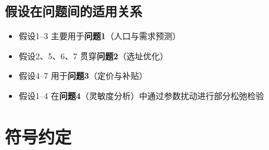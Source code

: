 \documentclass[UTF8]{ctexart}
\begin{document}
\subsection*{假设在问题间的适用关系}

\begin{itemize}
    \item 假设1–3 主要用于\textbf{问题1}（人口与需求预测）
    \item 假设2、5、6、7 贯穿\textbf{问题2}（选址优化）
    \item 假设4–7 用于\textbf{问题3}（定价与补贴）
    \item 假设1–4 在\textbf{问题4}（灵敏度分析）中通过参数扰动进行部分松弛检验
\end{itemize}


\section{符号约定}
\end{document}
